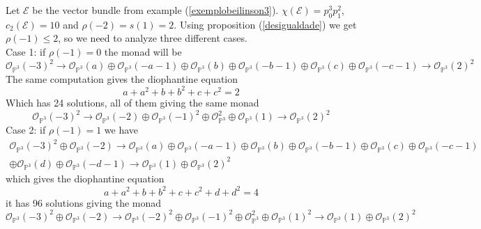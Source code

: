 \documentclass[
	oldfontcommands,
	sumario=abnt-6027-2012,
	12pt,			%
	openright,		%
	oneside,		%
	a4paper,		%
	english,		%
	brazil			%
	]{imecc-unicamp}
\begin{document}
\begin{example}
Let $\mathcal{E}$ be the vector bundle from example (\ref{exemplobeilinson3}). $\chi(\mathcal{E})=p_0^3p_1^2$, $c_2(\mathcal{E})=10$ and $\rho(-2)=s(1)=2$. Using proposition (\ref{desigualdade}) we get $\rho(-1) \leq 2$, so we need to analyze three different cases.\\
Case 1: if $\rho(-1)=0$ the monad will be
\begin{equation}
\mathcal{O}_{\mathbb{P}^3}(-3)^{2} \to \mathcal{O}_{\mathbb{P}^3}(a)\oplus\mathcal{O}_{\mathbb{P}^3}(-a-1)\oplus\mathcal{O}_{\mathbb{P}^3}(b)\oplus\mathcal{O}_{\mathbb{P}^3}(-b-1)\oplus \mathcal{O}_{\mathbb{P}^3}(c) \oplus \mathcal{O}_{\mathbb{P}^3}(-c-1) \to \mathcal{O}_{\mathbb{P}^3}(2)^{2}
\end{equation}
The same computation gives the diophantine equation
\begin{equation}
a+a^2+b+b^2+c+c^2=2
\end{equation}
Which has 24 solutions, all of them giving the same monad
\begin{equation}
\mathcal{O}_{\mathbb{P}^3}(-3)^{2} \to \mathcal{O}_{\mathbb{P}^3}(-2)\oplus\mathcal{O}_{\mathbb{P}^3}(-1)^2\oplus\mathcal{O}_{\mathbb{P}^3}^2\oplus \mathcal{O}_{\mathbb{P}^3}(1) \to \mathcal{O}_{\mathbb{P}^3}(2)^{2}
\end{equation}
Case 2: if $\rho(-1)=1$ we have
\begin{equation}
\begin{split}
\mathcal{O}_{\mathbb{P}^3}(-3)^{2} \oplus \mathcal{O}_{\mathbb{P}^3}(-2) \to  \mathcal{O}_{\mathbb{P}^3}(a)\oplus\mathcal{O}_{\mathbb{P}^3}(-a-1)\oplus\mathcal{O}_{\mathbb{P}^3}(b)\oplus\mathcal{O}_{\mathbb{P}^3}(-b-1)\oplus \mathcal{O}_{\mathbb{P}^3}(c) \oplus \mathcal{O}_{\mathbb{P}^3}(-c-1) \\ \oplus \mathcal{O}_{\mathbb{P}^3}(d) \oplus \mathcal{O}_{\mathbb{P}^3}(-d-1) \to  \mathcal{O}_{\mathbb{P}^3}(1) \oplus \mathcal{O}_{\mathbb{P}^3}(2)^{2}
\end{split}
\end{equation}
which gives the diophantine equation
\begin{equation}
a+a^2+b+b^2+c+c^2+d+d^2=4
\end{equation}
it has 96 solutions giving the monad
\begin{equation}
\mathcal{O}_{\mathbb{P}^3}(-3)^{2} \oplus \mathcal{O}_{\mathbb{P}^3}(-2) \to  \mathcal{O}_{\mathbb{P}^3}(-2)^2\oplus\mathcal{O}_{\mathbb{P}^3}(-1)^2\oplus \mathcal{O}_{\mathbb{P}^3}^2\oplus \mathcal{O}_{\mathbb{P}^3}(1)^2\to  \mathcal{O}_{\mathbb{P}^3}(1) \oplus \mathcal{O}_{\mathbb{P}^3}(2)^{2}

\end{equation}
\end{example}
\end{document}
